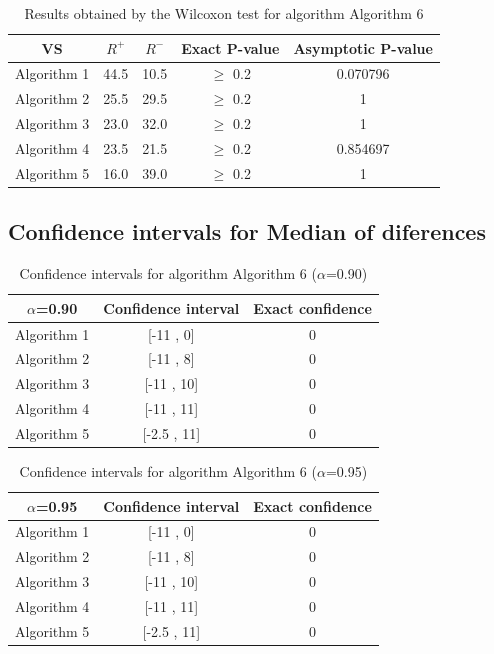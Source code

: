 \documentclass[a4paper,10pt]{article}
\begin{document}
\begin{table}[!htp]
\centering\small
\begin{tabular}{
|c|c|c|c|c|}
\hline
 VS & $R^{+}$ & $R^{-}$ & Exact P-value & Asymptotic P-value \\ \hline 
Algorithm 1 & 44.5 & 10.5 & $\geq$ 0.2 & 0.070796\\ \hline 
Algorithm 2 & 25.5 & 29.5 & $\geq$ 0.2 & 1\\ \hline 
Algorithm 3 & 23.0 & 32.0 & $\geq$ 0.2 & 1\\ \hline 
Algorithm 4 & 23.5 & 21.5 & $\geq$ 0.2 & 0.854697\\ \hline 
Algorithm 5 & 16.0 & 39.0 & $\geq$ 0.2 & 1\\ \hline 

\end{tabular}
\caption{Results obtained by the Wilcoxon test for algorithm Algorithm 6}
\end{table}

\subsection{Confidence intervals for Median of diferences}

\begin{table}[!htp]
\centering\small
\begin{tabular}{
|c|c|c|}
\hline
 $\alpha$=0.90 & Confidence interval & Exact confidence \\ \hline 
Algorithm 1 & [-11 , 0] & 0\\ \hline 
Algorithm 2 & [-11 , 8] & 0\\ \hline 
Algorithm 3 & [-11 , 10] & 0\\ \hline 
Algorithm 4 & [-11 , 11] & 0\\ \hline 
Algorithm 5 & [-2.5 , 11] & 0\\ \hline 

\end{tabular}
\caption{Confidence intervals for algorithm Algorithm 6 ($\alpha$=0.90)}
\end{table}
\begin{table}[!htp]
\centering\small
\begin{tabular}{
|c|c|c|}
\hline
 $\alpha$=0.95 & Confidence interval & Exact confidence \\ \hline 
Algorithm 1 & [-11 , 0] & 0\\ \hline 
Algorithm 2 & [-11 , 8] & 0\\ \hline 
Algorithm 3 & [-11 , 10] & 0\\ \hline 
Algorithm 4 & [-11 , 11] & 0\\ \hline 
Algorithm 5 & [-2.5 , 11] & 0\\ \hline 

\end{tabular}
\caption{Confidence intervals for algorithm Algorithm 6 ($\alpha$=0.95)}
\end{table}

 \clearpage 
\end{document}
